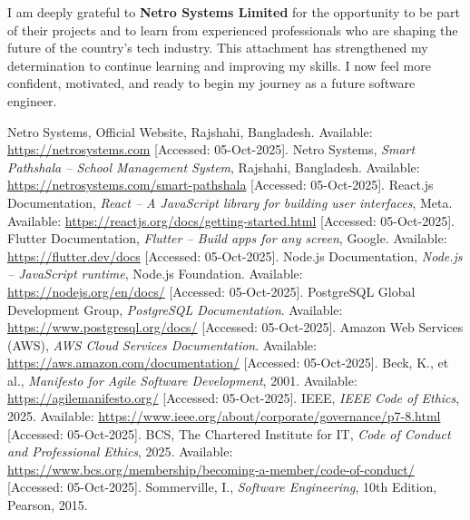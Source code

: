 \documentclass[12pt,a4paper]{report}
\newcommand{\company}[1]{\textcolor{companycolor}{\textbf{#1}}}
\begin{document}
I am deeply grateful to \company{Netro Systems Limited} for the opportunity to be part of their projects and to learn from experienced professionals who are shaping the future of the country's tech industry. This attachment has strengthened my determination to continue learning and improving my skills. I now feel more confident, motivated, and ready to begin my journey as a future software engineer.


\begin{thebibliography}{11}
 Netro Systems, Official Website, Rajshahi, Bangladesh. Available: \url{https://netrosystems.com} [Accessed: 05-Oct-2025].
 Netro Systems, \textit{Smart Pathshala – School Management System}, Rajshahi, Bangladesh. Available: \url{https://netrosystems.com/smart-pathshala} [Accessed: 05-Oct-2025].
 React.js Documentation, \textit{React – A JavaScript library for building user interfaces}, Meta. Available: \url{https://reactjs.org/docs/getting-started.html} [Accessed: 05-Oct-2025].
 Flutter Documentation, \textit{Flutter – Build apps for any screen}, Google. Available: \url{https://flutter.dev/docs} [Accessed: 05-Oct-2025].
 Node.js Documentation, \textit{Node.js – JavaScript runtime}, Node.js Foundation. Available: \url{https://nodejs.org/en/docs/} [Accessed: 05-Oct-2025].
 PostgreSQL Global Development Group, \textit{PostgreSQL Documentation}. Available: \url{https://www.postgresql.org/docs/} [Accessed: 05-Oct-2025].
 Amazon Web Services (AWS), \textit{AWS Cloud Services Documentation}. Available: \url{https://aws.amazon.com/documentation/} [Accessed: 05-Oct-2025].
 Beck, K., et al., \textit{Manifesto for Agile Software Development}, 2001. Available: \url{https://agilemanifesto.org/} [Accessed: 05-Oct-2025].
 IEEE, \textit{IEEE Code of Ethics}, 2025. Available: \url{https://www.ieee.org/about/corporate/governance/p7-8.html} [Accessed: 05-Oct-2025].
 BCS, The Chartered Institute for IT, \textit{Code of Conduct and Professional Ethics}, 2025. Available: \url{https://www.bcs.org/membership/becoming-a-member/code-of-conduct/} [Accessed: 05-Oct-2025].
 Sommerville, I., \textit{Software Engineering}, 10th Edition, Pearson, 2015.
\end{thebibliography}
\end{document}
